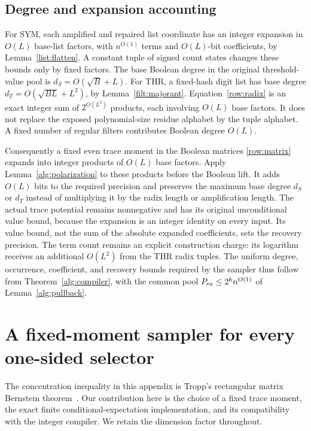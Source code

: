 \documentclass[11pt,letterpaper]{article}
\theoremstyle{definition}
\theoremstyle{remark}
\begin{document}
\subsection{Degree and expansion accounting}

For SYM, each amplified and repaired list coordinate has an integer
expansion in $O(L)$ base-list factors, with $n^{O(1)}$ terms and
$O(L)$-bit coefficients, by Lemma~\ref{list:flatten}.  A constant tuple
of signed count states changes these bounds only by fixed factors.
The base Boolean degree in the original threshold-value pool is
$d_S=O(\sqrt B+L)$.  For THR, a fixed-hash digit list has base degree
$d_T=O(\sqrt{BL}+L^2)$, by Lemma~\ref{filt:majorant}.
Equation~\eqref{row:radix} is an exact integer sum of
$2^{O(L^2)}$ products, each involving $O(L)$ base factors.  It does
not replace the exposed polynomial-size residue alphabet by the tuple
alphabet.  A fixed number of regular filters contributes Boolean
degree $O(L)$.

Consequently a fixed even trace moment in the Boolean matrices
\eqref{row:matrix} expands into integer products of $O(L)$ base
factors.  Apply Lemma~\ref{alg:polarization} to these products before
the Boolean lift.  It adds $O(L)$ bits to the required precision and
preserves the maximum base degree $d_S$ or $d_T$ instead of multiplying
it by the radix length or amplification length.  The actual trace
potential remains nonnegative and has its original unconditional value
bound, because the expansion is an integer identity on every input.
Its value bound, not the sum of the absolute expanded coefficients,
sets the recovery precision.  The term count remains an explicit
construction charge: its logarithm receives an additional $O(L^2)$
from the THR radix tuples.  The uniform degree, occurrence, coefficient,
and recovery bounds required by the sampler thus follow from
Theorem~\ref{alg:compiler}, with the common pool
$P_{\rm ex}\le2^kn^{O(1)}$ of Lemma~\ref{alg:pullback}.


\section{A fixed-moment sampler for every one-sided selector}
\label{samp:appendix}

The concentration inequality in this appendix is Tropp's rectangular
matrix Bernstein theorem~\cite[Theorem 1.6]{Tropp}. Our contribution
here is the choice of a fixed trace moment, the exact finite
conditional-expectation implementation, and its compatibility with the
integer compiler. We retain the dimension factor throughout.
\end{document}
